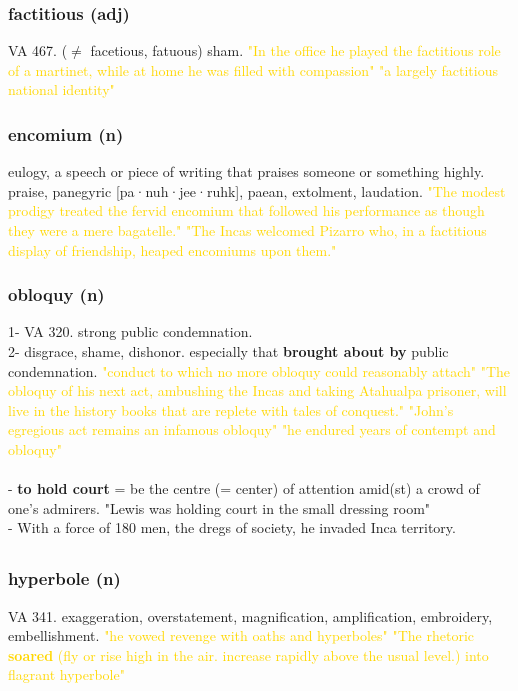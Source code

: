 \documentclass{proc}
\begin{document}
	\subsubsection{\textcolor{brickred}{factitious} (adj)}
	VA 467. ($\neq$ facetious, fatuous) sham.
	\textcolor{gold}{"In the office he played the factitious role of a martinet, while at home he was filled with compassion" "a largely factitious national identity"}
	
	\subsubsection{\textcolor{brickred}{encomium} (n)}
	eulogy, a speech or piece of writing that praises someone or something highly. praise, panegyric [pa·nuh·jee·ruhk], paean, extolment,
	laudation.
	\textcolor{gold}{"The modest prodigy treated the fervid encomium that followed his performance as though they were a mere bagatelle." "The Incas welcomed Pizarro who, in  a factitious display of friendship, heaped encomiums upon them."}
	
	\subsubsection{\textcolor{brickred}{obloquy} (n)}
	1- VA 320. strong public condemnation.\\
	2- disgrace, shame, dishonor. especially that \textbf{brought about by} public condemnation.
	\textcolor{gold}{"conduct to which no more obloquy could reasonably attach" "The obloquy of his next act, ambushing the Incas and taking Atahualpa prisoner, will live in  the history books that are replete with tales of conquest." "John's egregious act remains an infamous obloquy" "he endured years of contempt and obloquy"}\\\\
	- \textbf{to hold court} = be the centre (= center) of attention amid(st) a crowd of one's admirers.
	"Lewis was holding court in the small dressing room"\\
	- With a force of 180 men, the dregs of society, he invaded Inca territory.
	
	\newpage
	\subsection{}
	\subsubsection{\textcolor{brickred}{hyperbole} (n)}
	VA 341. exaggeration, overstatement, magnification, amplification, embroidery, embellishment.
	\textcolor{gold}{"he vowed revenge with oaths and hyperboles" "The rhetoric \textbf{soared} (fly or rise high in the air. increase rapidly above the usual level.) into flagrant hyperbole"}
	
\end{document}
